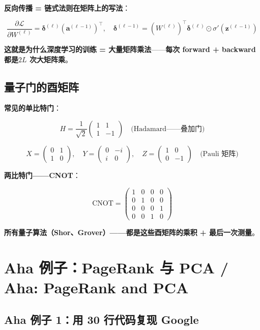 \textbf{反向传播 = 链式法则在矩阵上的写法}：

\[
\frac{\partial \mathcal{L}}{\partial W^{(\ell)}} = \bm{\delta}^{(\ell)} (\bm{a}^{(\ell-1)})^{\!\top}, \quad \bm{\delta}^{(\ell-1)} = (W^{(\ell)})^{\!\top} \bm{\delta}^{(\ell)} \odot \sigma'(\bm{z}^{(\ell-1)})
\]

\textbf{这就是为什么深度学习的训练 = 大量矩阵乘法}——\textbf{每次 forward + backward 都是$2L$ 次大矩阵乘}。

\subsection{量子门的酉矩阵}

\textbf{常见的单比特门}：

\[
H = \frac{1}{\sqrt{2}} \begin{pmatrix} 1 & 1 \\ 1 & -1 \end{pmatrix} \quad \text{(Hadamard——叠加门)}
\]

\[
X = \begin{pmatrix} 0 & 1 \\ 1 & 0 \end{pmatrix}, \quad Y = \begin{pmatrix} 0 & -i \\ i & 0 \end{pmatrix}, \quad Z = \begin{pmatrix} 1 & 0 \\ 0 & -1 \end{pmatrix} \quad \text{(Pauli 矩阵)}
\]

\textbf{两比特门——CNOT}：

\[
\mathrm{CNOT} = \begin{pmatrix} 1 & 0 & 0 & 0 \\ 0 & 1 & 0 & 0 \\ 0 & 0 & 0 & 1 \\ 0 & 0 & 1 & 0 \end{pmatrix}
\]

\textbf{所有量子算法（Shor、Grover）——都是\textbf{这些酉矩阵的乘积} + \textbf{最后一次测量}}。

\section{Aha 例子：PageRank 与 PCA / Aha: PageRank and PCA}

\subsection{Aha 例子 1：用 30 行代码复现 Google}

